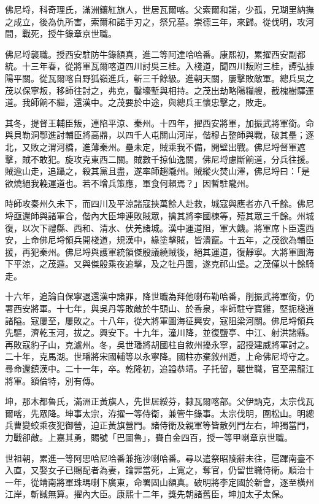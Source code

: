 \begin{pinyinscope}
佛尼埒，科奇理氏，滿洲鑲紅旗人，世居瓦爾喀。父索爾和諾，少孤，兄瑚里納撫之成立，後為仇所害，索爾和諾手刃之，祭兄墓。崇德三年，來歸。從伐明，攻河間，戰死，授牛錄章京世職。

佛尼埒襲職。授西安駐防牛錄額真，進二等阿達哈哈番。康熙初，累擢西安副都統。十三年春，從將軍瓦爾喀道四川討吳三桂。入棧道，聞四川叛附三桂，譚弘據陽平關。從瓦爾喀自野狐嶺進兵，斬三千餘級。進朝天關，屢擊敗敵軍。總兵吳之茂以保寧叛，移師往討之，弗克，鑿壕塹與相持。之茂出劫略陽糧艘，截槐樹驛運道。我師餉不繼，還漢中。之茂要於中途，與總兵王懷忠擊之，敗走。

其冬，提督王輔臣叛，連陷平涼、秦州。十四年，擢西安將軍，加振武將軍銜。命與貝勒洞鄂進討輔臣將高鼎，以四千人屯關山河岸，偕穆占整師與戰，破其壘；逐北，又敗之渭河橋，進薄秦州。壘未定，賊乘我不備，開壁出戰。佛尼埒督軍遮擊，賊不敢犯。旋攻克東西二關。賊數千掠仙逸關，佛尼埒慮斷餉道，分兵往援。賊逾山走，追躡之，殺其黨且盡，遂率師趨隴州。賊縱火焚山澤，佛尼埒曰：「是欲燒絕我輓運道也。若不增兵策應，軍食何賴焉？」因暫駐隴州。

時師攻秦州久未下，而四川及平涼諸寇挾萬餘人赴救，城寇與應者亦八千餘。佛尼埒亟還師與諸軍合，偕內大臣坤連敗賊眾，擒其將李國棟等，殪其眾三千餘。州城復，以次下禮縣、西和、清水、伏羌諸城。漢中運道阻，軍大饑。將軍席卜臣還西安，上命佛尼埒領兵開棧道，規漢中，緣塗擊賊，皆潰竄。十五年，之茂欲為輔臣援，再犯秦州。佛尼埒與護軍統領傑殷議繞賊後，絕其運道，復靜寧。大將軍圖海下平涼，之茂遁。又與傑殷乘夜追擊，及之牡丹園，遂克祁山堡。之茂僅以十餘騎走。

十六年，追論自保寧退還漢中諸罪，降世職為拜他喇布勒哈番，削振武將軍銜，仍署西安將軍。十七年，與吳丹等敗敵於牛頭山、於香泉，率師駐守寶雞，堅扼棧道諸隘。寇屢至，屢敗之。十八年，從大將軍圖海征興安，寇阻梁河關。佛尼埒領兵先驅，濟乾玉河，拔之。興安下。十九年，潼川降，並復鹽亭、中江、射洪諸縣。再敗寇豹子山，克瀘州。冬，吳世璠將胡國柱自敘州擾永寧，詔授建威將軍討之。二十年，克馬湖。世璠將宋國輔等以永寧降。國柱亦棄敘州遁，上命佛尼埒守之。尋命還鎮漢中。二十一年，卒。乾隆初，追謚恭靖。子托留，襲世職，官至黑龍江將軍。額倫特，別有傳。

坤，那木都魯氏，滿洲正黃旗人，先世居綏芬，隸瓦爾喀部。父伊訥克，太宗伐瓦爾喀，先眾降。坤事太宗，洊擢一等侍衛，兼管牛錄事。太宗伐明，圍松山。明總兵曹變蛟乘夜犯御營，迫正黃旗營門。諸侍衛及親軍等皆散列門左右，坤獨當門，力戰卻敵。上嘉其勇，賜號「巴圖魯」，賚白金四百，授一等甲喇章京世職。

世祖朝，累進一等阿思哈尼哈番兼拖沙喇哈番。尋以遣祭昭陵辭未往，扈蹕南臺不入直，又娶女子已賜配者為妻，論罪當死，上寬之，奪官，仍留世職侍衛。順治十一年，從靖南將軍珠瑪喇下廣東，命署固山額真。破明將李定國於新會，逐至橫州江岸，斬馘無算。擢內大臣。康熙十二年，獎先朝諸舊臣，坤加太子太保。


\end{pinyinscope}

